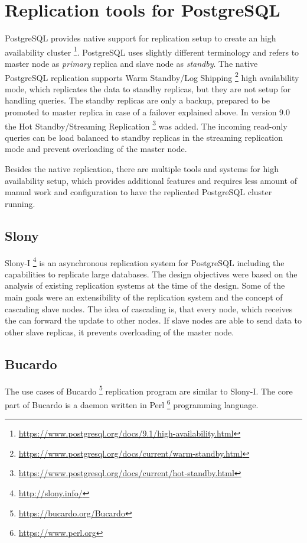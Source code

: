 \documentclass[
  digital, %
  twoside, %
  table,   %
  lof,     %
  lot,     %
]{fithesis3}
\begin{document}
\section{Replication tools for PostgreSQL} \label{sec:pg_replication}
PostgreSQL provides native support for replication setup to create an high availability cluster \footnote{\url{https://www.postgresql.org/docs/9.1/high-availability.html}}. PostgreSQL uses slightly different terminology and refers to master node as \textit{primary} replica and slave node as \textit{standby}. The native PostgreSQL replication supports Warm Standby/Log Shipping \footnote{\url{https://www.postgresql.org/docs/current/warm-standby.html}} high availability mode, which replicates the data to standby replicas, but they are not setup for handling queries. The standby replicas are only a backup, prepared to be promoted to master replica in case of a failover explained above. In version 9.0 the Hot Standby/Streaming Replication \footnote{\url{https://www.postgresql.org/docs/current/hot-standby.html}} was added. The incoming read-only queries can be load balanced to standby replicas in the streaming replication mode and prevent overloading of the master node.

Besides the native replication, there are multiple tools and systems for high availability setup, which provides additional features and requires less amount of manual work and configuration to have the replicated PostgreSQL cluster running.

\subsection{Slony}
Slony-I \footnote{\url{http://slony.info/}} is an asynchronous replication system for PostgreSQL including the capabilities to replicate large databases. The design objectives were based on the analysis of existing replication systems at the time of the design. Some of the main goals were an extensibility of the replication system and the concept of cascading slave nodes. The idea of cascading is, that every node, which receives the can forward the update to other nodes. If slave nodes are able to send data to other slave replicas, it prevents overloading of the master node.

\subsection{Bucardo}
The use cases of Bucardo \footnote{\url{https://bucardo.org/Bucardo}} replication program are similar to Slony-I. The core part of Bucardo is a daemon written in Perl \footnote{\url{https://www.perl.org}} programming language.
\end{document}
